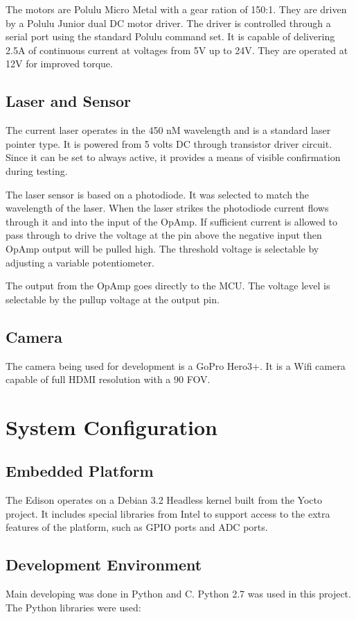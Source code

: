 \documentclass[botnum, fleqn]{unmeethesis}
\begin{document}
The motors are Polulu Micro Metal with a gear ration of 150:1. They are driven by a Polulu Junior dual DC motor driver. The driver is controlled through a serial port using the standard Polulu command set. It is capable of delivering 2.5A of continuous current at voltages from 5V up to 24V. They are operated at 12V for improved torque.

\subsection*{Laser and Sensor}
The current laser operates in the 450 nM wavelength and is a standard laser pointer type. It is powered from 5 volts DC through transistor driver circuit. Since it can be set to always active, it provides a means of visible confirmation during testing. 

The laser sensor is based on a photodiode. It was selected to match the wavelength of the laser. When the laser strikes the photodiode current flows through it and into the input of the OpAmp. If sufficient current is allowed to pass through to drive the voltage at the pin above the negative input then OpAmp output will be pulled high. The threshold voltage is selectable by adjusting a variable potentiometer. 

The output from the OpAmp goes directly to the MCU. The voltage level is selectable by the pullup voltage at the output pin.

\subsection*{Camera}
The camera being used for development is a GoPro Hero3+. It is a Wifi camera capable of full HDMI resolution with a 90 FOV. 

\section*{System Configuration}

\subsection*{Embedded Platform}
The Edison operates on a Debian 3.2 Headless kernel built from the Yocto project. It includes special libraries from Intel to support access to the extra features of the platform, such as GPIO ports and ADC ports. 

\subsection*{Development Environment}
Main developing was done in Python and C. Python 2.7 was used in this project. The Python libraries were used:
\end{document}
